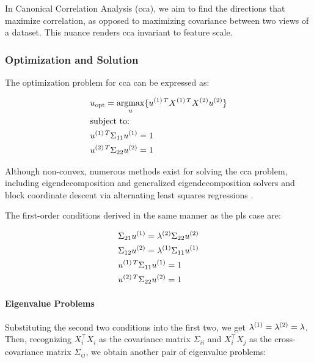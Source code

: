 In Canonical Correlation Analysis (\acrshort{cca}), we aim to find the directions that maximize correlation, as opposed to maximizing covariance between two \gls{views} of a dataset.
This nuance renders \acrshort{cca} invariant to feature scale.

\subsubsection{Optimization and Solution}
The optimization problem for \acrshort{cca} can be expressed as:

\begin{align}
    & u_{\text{opt}}=\underset{u}{\mathrm{argmax}}\{ u^{(1)\,T}X^{(1)\,T}X^{(2)}u^{(2)} \} \\
    & \text{subject to:} \notag                                                                \\
    & u^{(1)\,T}\Sigma_{11}u^{(1)}=1 \notag                                                  \\
    & u^{(2)\,T}\Sigma_{22}u^{(2)}=1 \notag
\end{align}

Although non-convex, numerous methods exist for solving the \acrshort{cca} problem, including eigendecomposition and generalized eigendecomposition solvers \citep{uurtio2017tutorial} and block coordinate descent via alternating least squares regressions \citep{golub1995canonical,sun2008least}.

The first-order conditions derived in the same manner as the \acrshort{pls} case are:

\begin{align}
    \label{CCA:FOCs}
    & \Sigma_{21}u^{(1)}=\lambda^{(2)} \Sigma_{22}u^{(2)} \\
    & \Sigma_{12}u^{(2)}=\lambda^{(1)} \Sigma_{11}u^{(1)} \\
    & u^{(1)\,T}\Sigma_{11}u^{(1)}=1                       \\
    & u^{(2)\,T}\Sigma_{22}u^{(2)}=1
\end{align}

\paragraph{Eigenvalue Problems}

Substituting the second two conditions into the first two, we get \(\lambda^{(1)}=\lambda^{(2)}=\lambda\). Then, recognizing \(X_i^{\top}X_i\) as the covariance matrix \(\Sigma_{ii}\) and \(X_i^{\top}X_j\) as the cross-covariance matrix \(\Sigma_{ij}\), we obtain another pair of eigenvalue problems:

